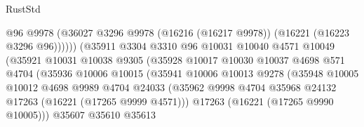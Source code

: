 \begin{lexlean}{RustStd}
\begin{coremodule}
                                        @96
                                        @9978
                                        (@36027
                                          @3296
                                          @9978
                                          (@16216 (@16217 @9978))
                                          (@16221 (@16223 @3296 @96))))))
                                  (@35911
                                    @3304
                                    @3310
                                    @96
                                    @10031
                                    @10040
                                    @4571
                                    @10049
                                    (@35921
                                      @10031
                                      @10038
                                      @9305
                                      (@35928
                                        @10017
                                        @10030
                                        @10037
                                        @4698
                                        @571
                                        @4704
                                        (@35936
                                          @10006
                                          @10015
                                          (@35941
                                            @10006
                                            @10013
                                            @9278
                                            (@35948
                                              @10005
                                              @10012
                                              @4698
                                              @9989
                                              @4704
                                              @24033
                                              (@35962
                                                @9998
                                                @4704
                                                @35968
                                                @24132
                                                @17263
                                                (@16221 (@17265 @9999 @4571)))
                                              @17263
                                              (@16221 (@17265 @9990 @10005)))
                                            @35607
                                            @35610
                                            @35613

\end{coremodule}
\end{lexlean}
